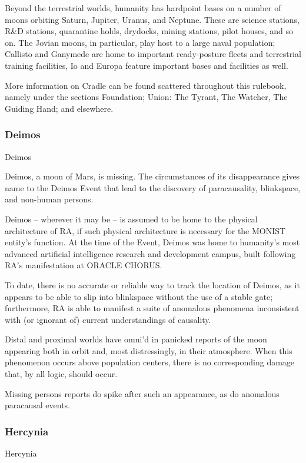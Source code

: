 Beyond the terrestrial worlds, humanity has hardpoint bases on a number of moons orbiting
Saturn, Jupiter, Uranus, and Neptune. These are science stations, R\&D stations, quarantine
holds, drydocks, mining stations, pilot houses, and so on. The Jovian moons, in particular, play
host to a large naval population; Callisto and Ganymede are home to important ready-posture
fleets and terrestrial training facilities, Io and Europa feature important bases and facilities as
well.


More information on Cradle can be found scattered throughout this rulebook, namely under the
sections Foundation; Union: The Tyrant, The Watcher, The Guiding Hand; and elsewhere.

\subsubsection{Deimos}
Deimos

Deimos, a moon of Mars, is missing. The circumstances of its disappearance gives name to the
Deimos Event that lead to the discovery of paracausality, blinkspace, and non-human persons.


Deimos -- wherever it may be -- is assumed to be home to the physical architecture of RA, if
such physical architecture is necessary for the MONIST entity’s function. At the time of the
Event, Deimos was home to humanity’s most advanced artificial intelligence research and
development campus, built following RA’s manifestation at ORACLE CHORUS.


To date, there is no accurate or reliable way to track the location of Deimos, as it appears to be
able to slip into blinkspace without the use of a stable gate; furthermore, RA is able to manifest a
suite of anomalous phenomena inconsistent with (or ignorant of) current understandings of
causality.


Distal and proximal worlds have omni’d in panicked reports of the moon appearing both in orbit
and, most distressingly, in their atmosphere. When this phenomenon occurs above population
centers, there is no corresponding damage that, by all logic, should occur.


Missing persons reports do spike after such an appearance, as do anomalous paracausal
events.




\subsubsection{Hercynia}
Hercynia

